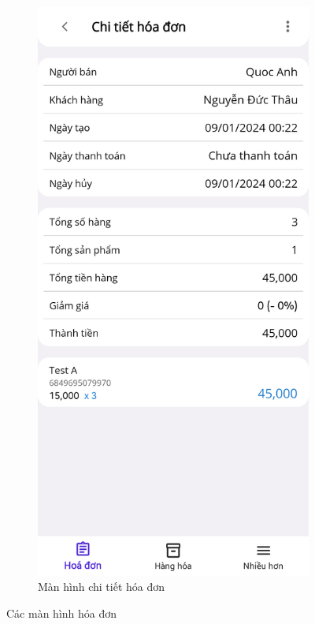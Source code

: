 \documentclass[../DoAn.tex]{subfiles}
\begin{document}
\begin{figure}[H]
    \begin{subfigure}{0.5\linewidth}
        \centering
        \includegraphics[width=0.9\linewidth]{Hinhve/design/screens/InvoiceDetailsPage}
        \caption{Màn hình chi tiết hóa đơn}
        \label{figure:screen-invoicedetailspage}
    \end{subfigure}
    \caption{Các màn hình hóa đơn}
    \label{figure:screen-invoicepages2}
\end{figure}
\break
\end{document}
